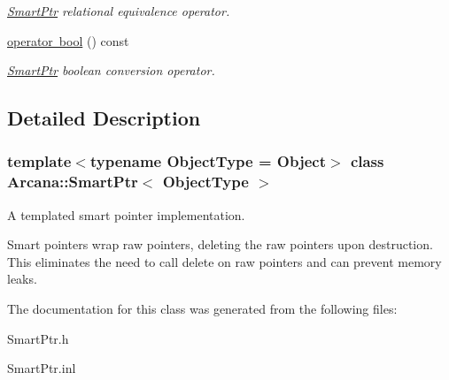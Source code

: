 \begin{DoxyCompactItemize}
\begin{DoxyCompactList}\small\item\em \mbox{\hyperlink{class_arcana_1_1_smart_ptr}{Smart\+Ptr}} relational equivalence operator. \end{DoxyCompactList}\item 
\mbox{\label{class_arcana_1_1_smart_ptr_aa991f679949c5e8f213f70924c8eddf2}} 
\mbox{\hyperlink{class_arcana_1_1_smart_ptr_aa991f679949c5e8f213f70924c8eddf2}{operator bool}} () const
\begin{DoxyCompactList}\small\item\em \mbox{\hyperlink{class_arcana_1_1_smart_ptr}{Smart\+Ptr}} boolean conversion operator. \end{DoxyCompactList}\end{DoxyCompactItemize}


\subsection{Detailed Description}
\subsubsection*{template$<$typename Object\+Type = Object$>$\newline
class Arcana\+::\+Smart\+Ptr$<$ Object\+Type $>$}

A templated smart pointer implementation. 

Smart pointers wrap raw pointers, deleting the raw pointers upon destruction. This eliminates the need to call \textquotesingle{}delete\textquotesingle{} on raw pointers and can prevent memory leaks. 

The documentation for this class was generated from the following files\+:\begin{DoxyCompactItemize}
\item 
Smart\+Ptr.\+h\item 
Smart\+Ptr.\+inl\end{DoxyCompactItemize}

